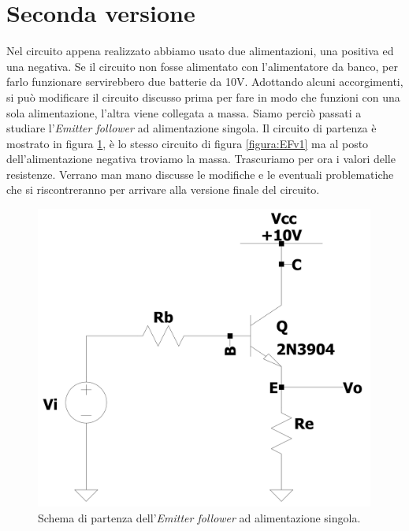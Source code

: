 \documentclass{report}
\begin{document}
\section{Seconda versione} %
Nel circuito appena realizzato abbiamo usato due alimentazioni, una positiva ed una negativa. Se il circuito non fosse alimentato con l'alimentatore da banco, per farlo funzionare servirebbero due batterie da 10V. Adottando alcuni accorgimenti, si può modificare il circuito discusso prima per fare in modo che funzioni con una sola alimentazione, l'altra viene collegata a massa. Siamo perciò passati a studiare l'\textit{Emitter follower} ad alimentazione singola. Il circuito di partenza è mostrato in figura \ref{figura:EFv2_1}, è lo stesso circuito di figura \ref{figura:EFv1} ma al posto dell'alimentazione negativa troviamo la massa. Trascuriamo per ora i valori delle resistenze. Verrano man mano discusse le modifiche e le eventuali problematiche che si riscontreranno per arrivare alla versione finale del circuito.
\begin{figure}[h]
\centering
\includegraphics[height=10cm]{immagini/EFv2_1}
\caption{Schema di partenza dell'\textit{Emitter follower} ad alimentazione singola.}
\label{figura:EFv2_1}
\end{figure}
\end{document}
